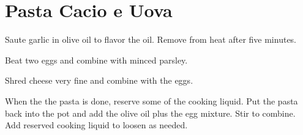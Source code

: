 \section{Pasta Cacio e Uova}
\begin{recipe}



Saute garlic in olive oil to flavor the oil. Remove from heat after five minutes. 


Beat two eggs and combine with minced parsley.


Shred cheese very fine and combine with the eggs.

When the the pasta is done, reserve some of the cooking liquid. Put the
pasta back into the pot and add the olive oil plus the egg mixture. Stir 
to combine. Add reserved cooking liquid to loosen as needed. 

\end{recipe}
